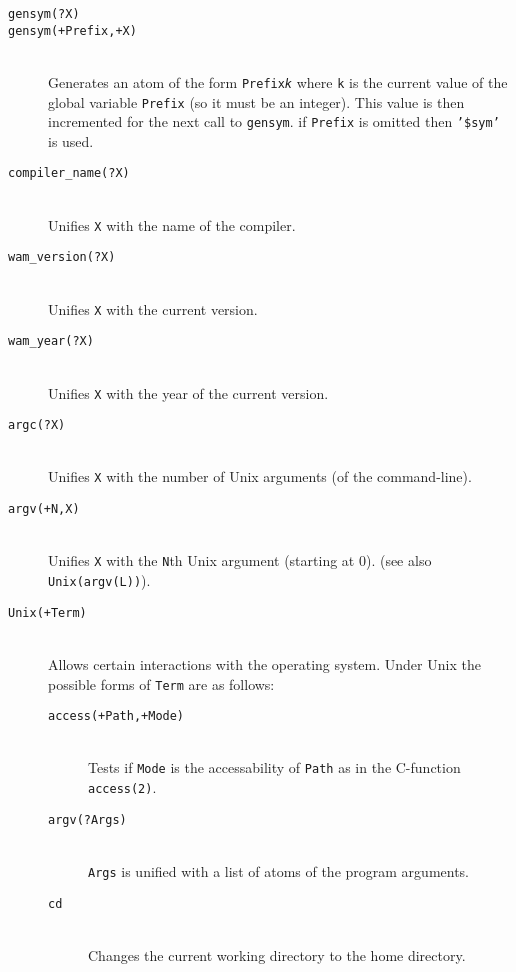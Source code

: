 \begin{description}
\item [{\tt gensym(?X)}]
\item [{\tt gensym(+Prefix,+X)}]~\\
	Generates an atom of the form {\tt Prefix{\em k}} where {\tt k}
	is the current value of the global variable {\tt Prefix} (so
	it must be an integer). This value is then incremented for the
	next call to {\tt gensym}. if {\tt Prefix} is omitted then
	{\tt '\$sym'} is used.


\item [{\tt compiler\_name(?X)}]~\\
	Unifies {\tt X} with the name of the compiler.

\item [{\tt wam\_version(?X)}]~\\
	Unifies {\tt X} with the current version.

\item [{\tt wam\_year(?X)}]~\\
	Unifies {\tt X} with the year of the current version.


\item [{\tt argc(?X)}]~\\
	Unifies {\tt X} with the number of Unix arguments (of the
	command-line).

\item [{\tt argv(+N,X)}]~\\
	Unifies {\tt X} with the {\tt N}th Unix argument (starting at 0).
	(see also {\tt Unix(argv(L))}).

\item [{\tt Unix(+Term)}]~\\
	Allows certain interactions with the operating system.  Under
	Unix the possible forms of {\tt Term} are as follows:

	\begin{description}

	\item [{\tt access(+Path,+Mode)}]~\\
		Tests if {\tt Mode} is the accessability of {\tt Path}
		as in the C-function {\tt access(2)}.  

	\item [{\tt argv(?Args)}]~\\
		{\tt Args} is unified with a list of atoms of the
		program arguments.

	\item [{\tt cd}]~\\
		Changes the current working directory to the home directory.


\end{description}
\end{description}
